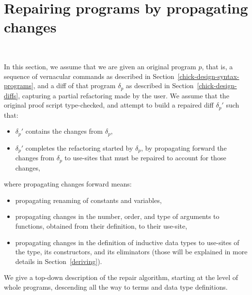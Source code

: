 \section{Repairing programs by propagating changes}~\label{chick-design-repair}

In this section, we assume that we are given an original program $p$, that is, a
sequence of vernacular commands as described in
Section~\ref{chick-design-syntax-programs}, and a diff of that program
$\delta_p$ as described in Section~\ref{chick-design-diffs}, capturing a partial
refactoring made by the user.  We assume that the original proof script
type-checked, and attempt to build a repaired diff $\delta_p'$ such that:

\begin{itemize}

\item $\delta_p'$ contains the changes from $\delta_p$,

\item $\delta_p'$ completes the refactoring started by $\delta_p$, by
propagating forward the changes from $\delta_p$ to use-sites that must be
repaired to account for those changes,

\end{itemize}
%
where propagating changes forward means:

\begin{itemize}

\item propagating renaming of constants and variables,

\item propagating changes in the number, order, and type of arguments to
functions, obtained from their definition, to their use-site,

\item propagating changes in the definition of inductive data types to use-sites
of the type, its constructors, and its eliminators (those will be explained in
more details in Section~\ref{deriving}).

\end{itemize}

We give a top-down description of the repair algorithm, starting at the level of
whole programs, descending all the way to terms and data type definitions.






